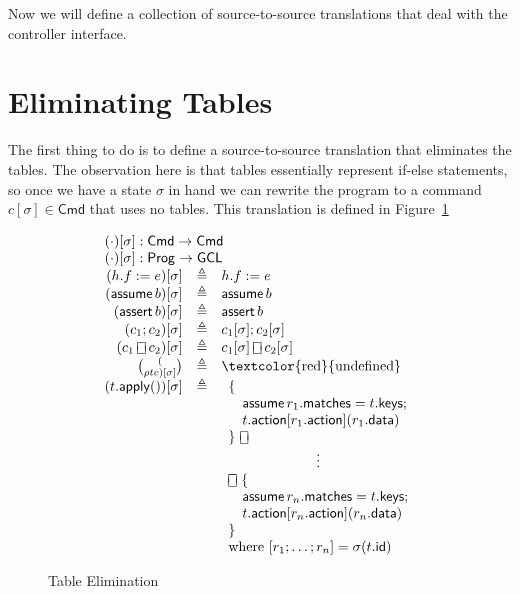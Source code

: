 \documentclass{article}
\newcommand{\Cmd}{\mathsf{Cmd}}
\newcommand{\Prog}{\mathsf{Prog}}
\newcommand{\GCL}{\mathsf{GCL}}
\newcommand{\matches}{\mathsf{matches}}
\newcommand{\action}{\mathsf{action}}
\newcommand{\keys}{\mathsf{keys}}
\newcommand{\data}{\mathsf{data}}
\newcommand{\id}{\mathsf{id}}
\newcommand{\assert}{\mathop{\mathsf{assert}}}
\newcommand{\assume}{\mathop{\mathsf{assume}}}
\newcommand{\apply}{\mathsf{apply}}
\newcommand{\choiceop}{\rotatebox[origin=c]{90}{$\sqsubset\!\!\!\sqsupset$}}
\newcommand{\choice}{\mathbin{\choiceop}}
\begin{document}
Now we will define a collection of source-to-source translations that deal with
the controller interface.

\section{Eliminating Tables}

The first thing to do is to define a source-to-source translation that
eliminates the tables. The observation here is that tables essentially represent
if-else statements, so once we have a state $\sigma$ in hand we can rewrite the
program to a command $c[\sigma] \in \Cmd$ that uses no tables. This translation
is defined in Figure~\ref{fig:table-elim}

\begin{figure}
  \[\begin{array}{r>{\triangleq}cl}
  \multicolumn{3}{l}{(\cdot)[\sigma] : \Cmd \to \Cmd} \\
  \multicolumn{3}{l}{(\cdot)[\sigma] : \Prog \to \GCL} \\
  (h.f := e)[\sigma] && h.f := e   \\
  (\assume b)[\sigma] && \assume b \\
  (\assert b)[\sigma] && \assert b \\
  (c_1;c_2)[\sigma] && c_1[\sigma];c_2[\sigma] \\
  (c_1 \choice c_2)[\sigma] && c_1[\sigma] \choice c_2[\sigma] \\
  (\choose \rho t c)[\sigma] && \textrm{\textcolor{red}{undefined}}\\
  (t.\apply())[\sigma] &&
  \begin{array}[t]{l}
    \{\\
    \quad \assume {r_1.\matches = t.\keys};\\
    \quad t.\action[r_1.\action](r_1.\data)\\
    \}~\choice\\
    \multicolumn{1}{c}{\vdots}\\
    \choice~\{\\
    \quad \assume {r_n.\matches = t.\keys};\\
    \quad t.\action[r_n.\action](r_n.\data)\\
    \}\\
    \textrm{where}~[r_1;\ldots;r_n] = \sigma(t.\id)
  \end{array}
  \end{array}
  \]
  \caption{Table Elimination}
  \label{fig:table-elim}
\end{figure}
\end{document}
